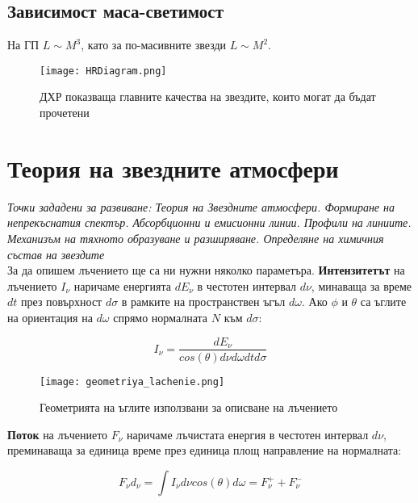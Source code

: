 \documentclass[a4paper,12pt]{article}
\begin{document}
\subsection{Зависимост маса-светимост}

На ГП $L \sim M^3$,  като за по-масивните звезди $L \sim M^2$.

\begin{figure}[h!]
\centering
\texttt{[image: HRDiagram.png]}
\caption{ДХР показваща главните качества на звездите, които могат да бъдат прочетени}
\label{fig:HRD}
\end{figure}

\section{Теория на звездните атмосфери}

\textit{Точки зададени за развиване:  Теория на Звездните атмосфери. Формиране на непрекъснатия спектър. Абсорбционни и емисионни линии. Профили на линиите. Механизъм на тяхното образуване и разширяване. Определяне на химичния състав на звездите}\\

 За да опишем лъчението ще са ни нужни няколко параметъра. \textbf{Интензитетът} на лъчението $I_{\nu}$ наричаме енергията $dE_{\nu}$ в честотен интервал $d\nu$, минаваща за време $dt$ през повърхност $d\sigma$ в рамките на пространствен ъгъл $d\omega$.  Ако $\phi$  и $\theta$ са ъглите на ориентация на $d\omega$ спрямо  нормалната $N$  към $d\sigma$:

\begin{equation}
I_{\nu} = \frac{dE_{\nu}} {cos(\theta) d\nu d\omega dt d\sigma}
\end{equation}


\begin{figure}[h!]
\centering
\texttt{[image: geometriya\_lachenie.png]}
\caption{Геометрията на ъглите използвани за описване на лъчението}
\label{fig:geometriya_lachenie}
\end{figure}


\textbf{Поток} на лъчението $F_{\nu}$ наричаме лъчистата енергия в честотен интервал $d\nu$, преминаваща за единица време през единица площ направление на нормалната:

\begin{equation}
F_{\nu}d_{\nu} = \int I_{\nu} d\nu cos(\theta) d\omega = F_{\nu}^{+} + F_{\nu}^{-}
\end{equation}
\end{document}
